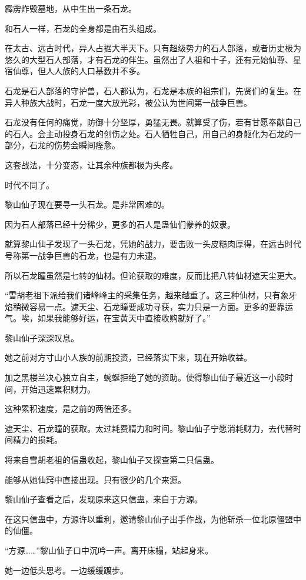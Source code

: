 \begin{this_body}
霹雳炸毁墓地，从中生出一条石龙。

和石人一样，石龙的全身都是由石头组成。

在太古、远古时代，异人占据大半天下。只有超级势力的石人部落，或者历史极为悠久的大型石人部落，才有石龙的伴生。虽然出了人祖和十子，还有元始仙尊、星宿仙尊，但人人族的人口基数并不多。

石龙是石人部落的守护兽，石人都认为，石龙是本族的祖宗们，先贤们的复生。在异人种族大战时，石龙一度大放光彩，被公认为世间第一战争巨兽。

石龙没有任何的痛觉，防御十分坚厚，勇猛无畏。就算受了伤，若有甘愿奉献自己的石人。会主动投身石龙的创伤之处。石人牺牲自己，用自己的身躯化为石龙的一部分，石龙的伤势会瞬间痊愈。

这套战法，十分变态，让其余种族都极为头疼。

时代不同了。

黎山仙子现在要寻一头石龙。是非常困难的。

因为石人部落已经十分稀少，更多的石人是蛊仙们豢养的奴隶。

就算黎山仙子发现了一头石龙，凭她的战力，要击败一头皮糙肉厚得，在远古时代号称第一战争巨兽的石龙，也是有力未逮。

所以石龙瞳虽然是七转的仙材。但论获取的难度，反而比把八转仙材遮天尘更大。

“雪胡老祖下派给我们诸峰峰主的采集任务，越来越重了。这三种仙材，只有象牙焰稍微容易一点。遮天尘、石龙瞳要成功寻获，实力只是一方面。更多的要靠运气。唉，如果我能够好运，在宝黄天中直接收购就好了。”

黎山仙子深深叹息。

她之前对方寸山小人族的前期投资，已经落实下来，现在开始收益。

加之黑楼兰决心独立自主，蜿蜒拒绝了她的资助。使得黎山仙子最近这一小段时间，开始迅速累积财力。

这种累积速度，是之前的两倍还多。

遮天尘、石龙瞳的获取。太过耗费精力和时间。黎山仙子宁愿消耗财力，去代替时间精力的损耗。

将来自雪胡老祖的信蛊收起，黎山仙子又探查第二只信蛊。

能够从她仙窍中直接出现。只有很少的几个来源。

黎山仙子查看之后，发现原来这只信蛊，来自于方源。

在这只信蛊中，方源许以重利，邀请黎山仙子出手作战，为他斩杀一位北原僵盟中的仙僵。

“方源……”黎山仙子口中沉吟一声。离开床榻，站起身来。

她一边低头思考。一边缓缓踱步。


\end{this_body}

